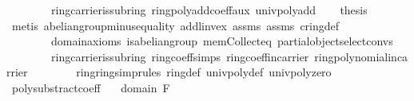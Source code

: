\begin{isabellebody}
\ \ \ \ \ \ \ \ ring{\isachardot}{\kern0pt}carrier{\isacharunderscore}{\kern0pt}is{\isacharunderscore}{\kern0pt}subring\ ring{\isachardot}{\kern0pt}poly{\isacharunderscore}{\kern0pt}add{\isacharunderscore}{\kern0pt}coeff{\isacharunderscore}{\kern0pt}aux\ univ{\isacharunderscore}{\kern0pt}poly{\isacharunderscore}{\kern0pt}add{\isacharparenright}{\kern0pt}\isanewline
\ \ \isamarkupfalse%
\ {\isacharquery}{\kern0pt}thesis\ \isanewline
\ \ \ \ \isamarkupfalse%
\ {\isacharparenleft}{\kern0pt}metis\ abelian{\isacharunderscore}{\kern0pt}group{\isachardot}{\kern0pt}minus{\isacharunderscore}{\kern0pt}equality\ add{\isachardot}{\kern0pt}l{\isacharunderscore}{\kern0pt}inv{\isacharunderscore}{\kern0pt}ex\ assms{\isacharparenleft}{\kern0pt}{}{\isacharparenright}{\kern0pt}\ assms{\isacharparenleft}{\kern0pt}{}{\isacharparenright}{\kern0pt}\ cring{\isacharunderscore}{\kern0pt}def\ \isanewline
\ \ \ \ \ \ \ \ domain{\isachardot}{\kern0pt}axioms{\isacharparenleft}{\kern0pt}{}{\isacharparenright}{\kern0pt}\ is{\isacharunderscore}{\kern0pt}abelian{\isacharunderscore}{\kern0pt}group\ mem{\isacharunderscore}{\kern0pt}Collect{\isacharunderscore}{\kern0pt}eq\ partial{\isacharunderscore}{\kern0pt}object{\isachardot}{\kern0pt}select{\isacharunderscore}{\kern0pt}convs{\isacharparenleft}{\kern0pt}{}{\isacharparenright}{\kern0pt}\ \isanewline
\ \ \ \ \ \ \ \ ring{\isachardot}{\kern0pt}carrier{\isacharunderscore}{\kern0pt}is{\isacharunderscore}{\kern0pt}subring\ ring{\isachardot}{\kern0pt}coeff{\isachardot}{\kern0pt}simps{\isacharparenleft}{\kern0pt}{}{\isacharparenright}{\kern0pt}\ ring{\isachardot}{\kern0pt}coeff{\isacharunderscore}{\kern0pt}in{\isacharunderscore}{\kern0pt}carrier\ ring{\isachardot}{\kern0pt}polynomial{\isacharunderscore}{\kern0pt}in{\isacharunderscore}{\kern0pt}carrier\isanewline
\ \ \ \ \ \ \ \ ring{\isachardot}{\kern0pt}ring{\isacharunderscore}{\kern0pt}simprules{\isacharparenleft}{\kern0pt}{}{}{\isacharparenright}{\kern0pt}\ ring{\isacharunderscore}{\kern0pt}def\ univ{\isacharunderscore}{\kern0pt}poly{\isacharunderscore}{\kern0pt}def\ univ{\isacharunderscore}{\kern0pt}poly{\isacharunderscore}{\kern0pt}zero{\isacharparenright}{\kern0pt}\isanewline
{}\isamarkupfalse%
%
\endisatagproof
{\isafoldproof}%
%
\isadelimproof
\isanewline
%
\endisadelimproof
\isanewline
{}\isamarkupfalse%
\ poly{\isacharunderscore}{\kern0pt}substract{\isacharunderscore}{\kern0pt}coeff{\isacharcolon}{\kern0pt}\isanewline
\ \ \ {\isachardoublequoteopen}domain\ F{\isachardoublequoteclose}\isanewline

\end{isabellebody}

